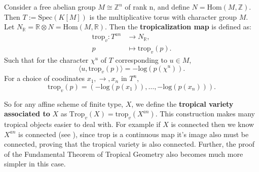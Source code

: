     Consider a free abelian group $M \cong \mathbb{Z}^n$ of rank n, and define $N = \text{Hom}(M,\mathbb{Z})$. 
    Then $T:= \text{Spec}(K[M])$ is the multiplicative torus with character group $M$. 
    Let $N_{\mathbb{R}} = \mathbb{R} \otimes N = \text{Hom}(M,\mathbb{R})$. Then the \textbf{tropicalization map} is defined as:
    \begin{align*}
        \text{trop}_v:T^{an} &\to N_{\mathbb{R}},\\
        p &\mapsto \text{trop}_v(p).
    \end{align*}
    Such that for the character $\chi^u$ of $T$ corresponding to $u \in M$, 
    \[
        \langle u,\text{trop}_{v}(p)\rangle = -\text{log}(p(\chi^{u})).
    \]
    For a choice of coodinates $x_1, \to, x_n$ in $T^{n}$, 
    \[
        \text{trop}_v(p) = (-\text{log}(p(x_1)), \dots,\allowbreak -\text{log}(p(x_n))).
    \]
    \par So for any affine scheme of finite type, $X$, we define the \textbf{tropical variety associated to }$X$ as $\text{Trop}_v(X) = \text{trop}_v(X^{an})$. 
    This construction makes many tropical objects easier to deal with. 
    For example if $X$ is connected then we know $X^{an}$ is connected (see \cite{berkovich2012spectral}), since $\text{trop}$ is a continuous map it's image also must be connected, proving that the tropical variety is also connected.
    Further, the proof of the Fundamental Theorem of Tropical Geometry also becomes much more simpler in this case.
